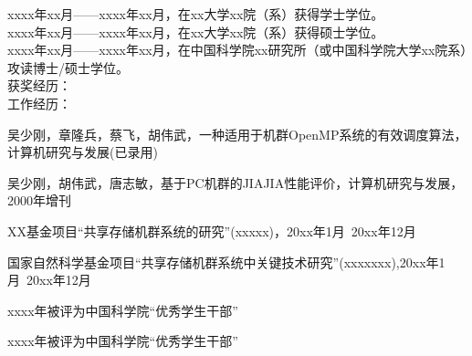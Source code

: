 \begin{resume}


\noindent
xxxx年xx月——xxxx年xx月，在xx大学xx院（系）获得学士学位。\\
\noindent
xxxx年xx月——xxxx年xx月，在xx大学xx院（系）获得硕士学位。\\
\noindent
xxxx年xx月——xxxx年xx月，在中国科学院xx研究所（或中国科学院大学xx院系）攻读博士/硕士学位。\\
\noindent
获奖经历：\\
\noindent
工作经历：\\


  \begin{enumerate}[{[}1{]}]
  \item 吴少刚，章隆兵，蔡飞，胡伟武，一种适用于机群OpenMP系统的有效调度算法，计算机研究与发展(已录用)
  \item 吴少刚，胡伟武，唐志敏，基于PC机群的JIAJIA性能评价，计算机研究与发展，2000年增刊

  \end{enumerate}

  \begin{enumerate}[{[}1{]}]
  \item XX基金项目“共享存储机群系统的研究”(xxxxx)，20xx年1月~20xx年12月
  \item 国家自然科学基金项目“共享存储机群系统中关键技术研究”(xxxxxxx),20xx年1月~20xx年12月
  \end{enumerate}

  \begin{enumerate}[{[}1{]}]
  \item  xxxx年被评为中国科学院“优秀学生干部”
  \item xxxx年被评为中国科学院“优秀学生干部”
  \end{enumerate}
\end{resume}
